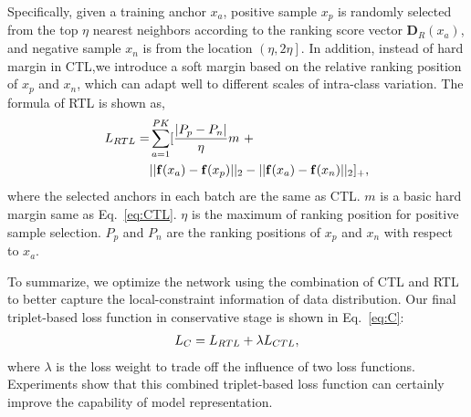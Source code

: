 \documentclass[10pt,twocolumn,letterpaper]{article}
\begin{document}
Specifically, given a training anchor $x_a$, positive sample $x_p$ is randomly selected from the top $\eta$ nearest neighbors according to the ranking score vector $\textbf{D}_{R}(x_a)$, and negative sample $x_n$ is from the location $\left(\eta, 2\eta\right]$. In addition, instead of hard margin in CTL,we introduce a soft margin based on the relative ranking position of $x_p$ and $x_n$, which can adapt well to different scales of intra-class variation. The formula of RTL is shown as,
\begin{equation}
\setlength{\abovedisplayskip}{0.1cm}
\setlength{\belowdisplayskip}{0.1cm}
\begin{aligned}
L_{RTL} = & \sum_{a=1}^{PK}[\dfrac{\vert P_p - P_n\vert}{\eta}m ~+ \\
& ||\mathbf{f}(x_a)-\mathbf{f}(x_p)||_2 - ||\mathbf{f}(x_a)-\mathbf{f}(x_n)||_2]_+,
\end{aligned}
\label{eq:RTL}
\end{equation}
where the selected anchors in each batch are the same as CTL. $m$ is a basic hard margin same as Eq.~\eqref{eq:CTL}. $\eta$ is the maximum of ranking position for positive sample selection. $P_p$ and $P_n$ are the ranking positions of $x_p$ and $x_n$ with respect to $x_a$.

To summarize, we optimize the network using the combination of CTL and RTL to better capture the local-constraint information of data distribution. Our final triplet-based loss function in conservative stage is shown in Eq.~\eqref{eq:C}: 
\begin{equation}
\setlength{\abovedisplayskip}{0.1cm}
\setlength{\belowdisplayskip}{0.1cm}
\begin{aligned}
L_{C} = L_{RTL} +\lambda  L_{CTL},
\end{aligned}
\label{eq:C}
\end{equation}
where $\lambda$ is the loss weight to trade off the influence of two loss functions. Experiments show that this combined triplet-based loss function can certainly improve the capability of model representation.
\end{document}
